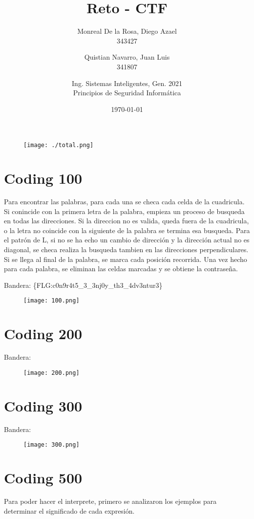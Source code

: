 \documentclass{article}
\title{Reto - CTF}
\author{
	Monreal De la Rosa, Diego Azael\\
	343427
	\and
	Quistian Navarro, Juan Luis\\
	341807
	\and
	Ing. Sistemas Inteligentes, Gen. 2021\\
	Principios de Seguridad Informática
}
\date{\today}
\begin{document}
\maketitle

\begin{figure}[H]
  \centering
  \texttt{[image: ./total.png]}
  \caption{}
\end{figure}


\section*{Coding 100}

Para encontrar las palabras, para cada una se checa cada celda de la cuadricula. Si conincide con la primera letra de la palabra, empieza un proceso de busqueda en todas las direcciones. Si la direccion no es valida, queda fuera de la cuadricula, o la letra no coincide con la siguiente de la palabra se termina esa busqueda. Para el patrón de L, si no se ha echo un cambio de dirección y la dirección actual no es diagonal, se checa realiza la busqueda tambien en las direcciones perpendiculares. Si se llega al final de la palabra, se marca cada posición recorrida. Una vez hecho para cada palabra, se eliminan las celdas marcadas y se obtiene la contraseña.

Bandera: \{FLG:c0n9r4t5\_3\_3nj0y\_th3\_4dv3ntur3\}
\begin{figure}[H]
  \centering
  \texttt{[image: 100.png]}
  \caption{}
\end{figure}



\section*{Coding 200}
Bandera: 
\begin{figure}[H]
  \centering
  \texttt{[image: 200.png]}
  \caption{}
\end{figure}
\section*{Coding 300}
Bandera: 
\begin{figure}[H]
  \centering
  \texttt{[image: 300.png]}
  \caption{}
\end{figure}
\section*{Coding 500}
Para poder hacer el interprete, primero se analizaron los ejemplos para determinar el significado de cada expresión.
\end{document}
